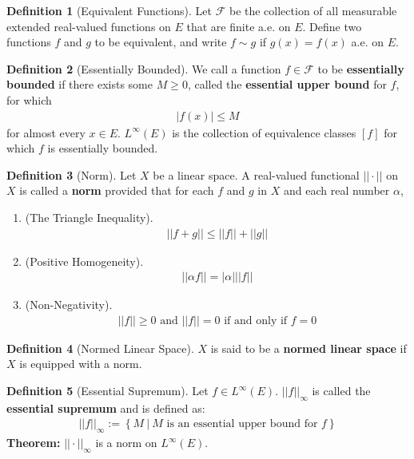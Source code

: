 \documentclass[11pt]{article}
\theoremstyle{definition}
\theoremstyle{definition}
\newcommand{\sets}[2]{ \left\{ #1\ |\ #2 \right\}}
\theoremstyle{definition}
\newtheorem{definition}{\textcolor{OliveGreen}{Definition}}
\theoremstyle{remark}
\begin{document}
\begin{definition}[Equivalent Functions]
	Let $\mathcal{F}$ be the collection of all measurable extended real-valued functions on $E$ that are finite a.e. on $E$. Define two functions $f$ and $g$ to be equivalent, and write $f \sim g$ if $g(x) = f(x)$ a.e. on $E$.
\end{definition}

\begin{definition}[Essentially Bounded]
	We call a function $f \in \mathcal{F}$ to be \textbf{essentially bounded} if there exists some $M \geq 0$, called the \textbf{essential upper bound} for $f$, for which 
	\begin{align*}
		|f(x)| \leq M 	
	\end{align*}
	for almost every $x \in E$. $L^\infty(E)$ is the collection of equivalence classes $[f]$ for which $f$ is essentially bounded. 
\end{definition}

\begin{definition}[Norm]
	Let $X$ be a linear space. A real-valued functional $|| \cdot ||$ on $X$ is called a \textbf{norm} provided that for each $f$ and $g$ in $X$ and each real number $\alpha$, 
	\begin{enumerate}[noitemsep] 
		\item (The Triangle Inequality). 
		\begin{align*}
			|| f + g || \leq ||f|| + ||g|| 	
		\end{align*}
		\item (Positive Homogeneity). 	
		\begin{align*}
			|| \alpha f || = |\alpha | || f || 	
		\end{align*}
		\item (Non-Negativity). 
		\begin{align*}
			|| f || \geq 0 \text{ and } ||f|| = 0 \text{ if and only if } f = 0	
		\end{align*}
	\end{enumerate}
\end{definition}

\begin{definition}[Normed Linear Space]
	$X$ is said to be a \textbf{normed linear space} if $X$ is equipped with a norm. 
\end{definition}

\begin{definition}[Essential Supremum]
	Let $f \in L^\infty (E)$. $||f||_\infty$ is called the \textbf{essential supremum} and is defined as: 
	\begin{align*}
		||f ||_\infty := \sets{M}{M \text{ is an essential upper bound for } f}	
	\end{align*}
	\textbf{Theorem:} $|| \cdot ||_\infty$ is a norm on $L^\infty (E)$. 
\end{definition}
\end{document}
